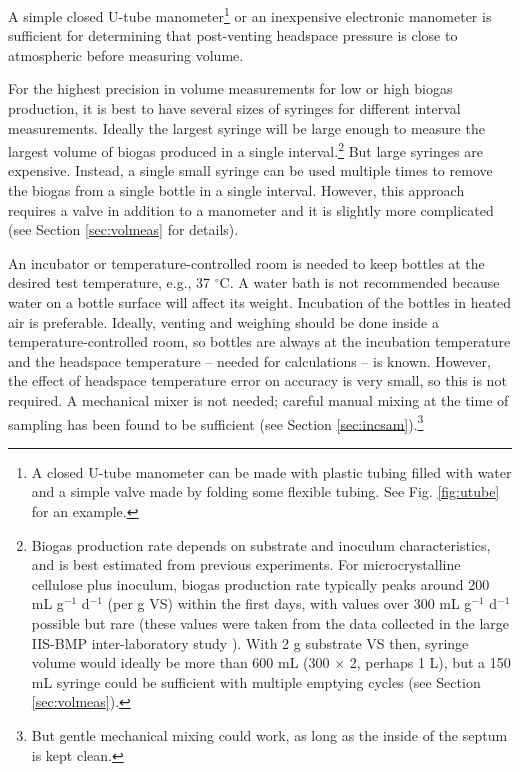 \documentclass[]{article}
\begin{document}
A simple closed U-tube manometer\footnote{
  A closed U-tube manometer can be made with plastic tubing filled with water and a simple valve made by folding some flexible tubing. See Fig. \ref{fig:utube} for an example.  
} or an inexpensive electronic manometer is sufficient for determining that post-venting headspace pressure is close to atmospheric before measuring volume.

For the highest precision in volume measurements for low or high biogas production, it is best to have several sizes of syringes for different interval measurements.
Ideally the largest syringe will be large enough to measure the largest volume of biogas produced in a single interval.\footnote{
\label{fn:cellrate}
  Biogas production rate depends on substrate and inoculum characteristics, and is best estimated from previous experiments.
  For microcrystalline cellulose plus inoculum, biogas production rate typically peaks around 200 mL g$^{-1}$ d$^{-1}$ (per g VS) within the first days, with values over 300 mL g$^{-1}$ d$^{-1}$ possible but rare (these values were taken from the data collected in the large IIS-BMP inter-laboratory study \citep{hafnerImprovingInterlaboratoryReproducibility2020}).
  With 2 g substrate VS then, syringe volume would ideally be more than 600 mL (300 $\times$ 2, perhaps 1 L), but a 150 mL syringe could be sufficient with multiple emptying cycles (see Section \ref{sec:volmeas}).
}
But large syringes are expensive.
Instead, a single small syringe can be used multiple times to remove the biogas from a single bottle in a single interval.
However, this approach requires a valve in addition to a manometer and it is slightly more complicated (see Section \ref{sec:volmeas} for details).

An incubator or temperature-controlled room is needed to keep bottles at the desired test temperature, e.g., 37 $^\circ$C.
A water bath is not recommended because water on a bottle surface will affect its weight.
Incubation of the bottles in heated air is preferable.
Ideally, venting and weighing should be done inside a temperature-controlled room, so bottles are always at the incubation temperature and the headspace temperature -- needed for calculations -- is known.
However, the effect of headspace temperature error on accuracy is very small, so this is not required.
A mechanical mixer is not needed; careful manual mixing at the time of sampling has been found to be sufficient (see Section \ref{sec:incsam}).\footnote{But gentle mechanical mixing could work, as long as the inside of the septum is kept clean.}
\end{document}
